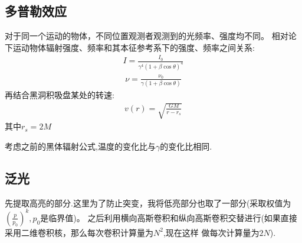 \documentclass[a4paper, 12pt]{article}
\begin{document}
    \subsection{多普勒效应}
    对于同一个运动的物体，不同位置观测者观测到的光频率、强度均不同。
    相对论下运动物体辐射强度、频率和其本征参考系下的强度、频率之间关系:
    \begin{align*}
        I = \frac{I_0}{\gamma^4(1+\beta\cos\theta)^4}
    \end{align*}
    \begin{align*}
        \nu = \frac{\nu_0}{\gamma(1+\beta\cos\theta)}
    \end{align*}
    再结合黑洞积吸盘某处的转速:
    \begin{align*}
        v(r) = \sqrt{\frac{GM}{r - r_s}}
    \end{align*}
    其中$r_s = 2M$\par
    考虑之前的黑体辐射公式,温度的变化比与$\gamma$的变化比相同.
    \subsection{泛光}
    先提取高亮的部分.这里为了防止突变，我将低亮部分也取了一部分(采取权值为$(\frac{p}{p_0} )^k,p_0$是临界值)。
    之后利用横向高斯卷积和纵向高斯卷积交替进行(如果直接采用二维卷积核，那么每次卷积计算量为$N^2$,现在这样
    做每次计算量为$2N$).
\end{document}
